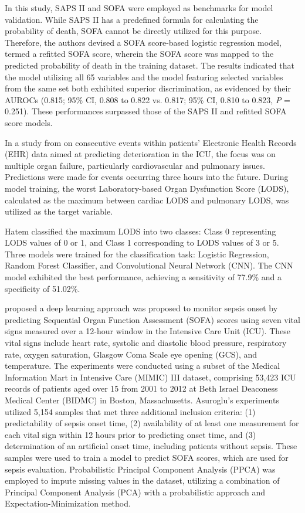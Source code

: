 \documentclass[12pt,a4paper,english
]{tunithesis}
\begin{document}
In this study, SAPS II and SOFA were employed as benchmarks for model validation. While SAPS II has a predefined formula for calculating the probability of death, SOFA cannot be directly utilized for this purpose. Therefore, the authors devised a SOFA score-based logistic regression model, termed a refitted SOFA score, wherein the SOFA score was mapped to the predicted probability of death in the training dataset. The results indicated that the model utilizing all 65 variables and the model featuring selected variables from the same set both exhibited superior discrimination, as evidenced by their AUROCs (0.815; 95\% CI, 0.808 to 0.822 vs. 0.817; 95\% CI, 0.810 to 0.823, \textit{P} = 0.251). These performances surpassed those of the SAPS II and refitted SOFA score models.

In a study from \textcite{hatem2018} on consecutive events within patients' Electronic Health Records (EHR) data aimed at predicting deterioration in the ICU, the focus was on multiple organ failure, particularly cardiovascular and pulmonary issues. Predictions were made for events occurring three hours into the future. During model training, the worst Laboratory-based Organ Dysfunction Score (LODS), calculated as the maximum between cardiac LODS and pulmonary LODS, was utilized as the target variable.

Hatem classified the maximum LODS into two classes: Class 0 representing LODS values of 0 or 1, and Class 1 corresponding to LODS values of 3 or 5. Three models were trained for the classification task: Logistic Regression, Random Forest Classifier, and Convolutional Neural Network (CNN). The CNN model exhibited the best performance, achieving a sensitivity of 77.9\% and a specificity of 51.02\%. 

\textcite{asuroglu2021} proposed a deep learning approach was proposed to monitor sepsis onset by predicting Sequential Organ Function Assessment (SOFA) scores using seven vital signs measured over a 12-hour window in the Intensive Care Unit (ICU). These vital signs include heart rate, systolic and diastolic blood pressure, respiratory rate, oxygen saturation, Glasgow Coma Scale eye opening (GCS), and temperature. The experiments were conducted using a subset of the Medical Information Mart in Intensive Care (MIMIC) III dataset, comprising 53,423 ICU records of patients aged over 15 from 2001 to 2012 at Beth Israel Deaconess Medical Center (BIDMC) in Boston, Massachusetts. Asuroglu's experiments utilized 5,154 samples that met three additional inclusion criteria: (1) predictability of sepsis onset time, (2) availability of at least one measurement for each vital sign within 12 hours prior to predicting onset time, and (3) determination of an artificial onset time, including patients without sepsis. These samples were used to train a model to predict SOFA scores, which are used for sepsis evaluation. Probabilistic Principal Component Analysis (PPCA) was employed to impute missing values in the dataset, utilizing a combination of Principal Component Analysis (PCA) with a probabilistic approach and Expectation-Minimization method.
\end{document}
